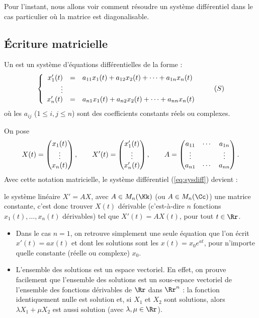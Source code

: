 \documentclass[12pt, class=report,crop=false]{standalone}
\begin{document}
Pour l'instant, nous allons voir comment résoudre un système différentiel dans le cas particulier où la matrice est diagonalisable.
 

\subsection{\'Ecriture matricielle}


Un  est un système d'équations différentielles de la forme :
\begin{equation}
\left\{\begin{array}{rcl}
x'_1(t)&=& a_{11}x_1(t)+a_{12}x_2(t)+\cdots+a_{1n}x_n(t)\cr
\vdots&& \cr 
x'_n(t) &=& a_{n1}x_1(t)+a_{n2}x_2(t)+\cdots+a_{nn}x_n(t)
\end{array}\right.
\label{eq:sysdiff}\tag{$S$}
\end{equation}
où les $a_{ij}$ ($1\le i,j \le n$) sont des coefficients constants réels ou complexes. 

On pose 
$$X(t) = \begin{pmatrix}x_1(t)\cr \vdots \cr x_n(t)\end{pmatrix},\qquad
X'(t) = \begin{pmatrix}x_1'(t)\cr \vdots \cr x_n'(t)\end{pmatrix},\qquad
A = \begin{pmatrix}
a_{11} & \cdots & a_{1n} \cr
\vdots &       & \vdots \cr
a_{n1} & \cdots & a_{nn} \cr
\end{pmatrix}.$$
Avec cette notation matricielle, le système différentiel (\ref{eq:sysdiff}) devient :


 le système linéaire $X'=AX$, avec $A \in M_n(\Kk)$ (ou $A \in M_n(\Cc)$) une matrice constante, c'est donc trouver $X(t)$ dérivable (c'est-à-dire $n$ fonctions $x_1(t),\ldots,x_n(t)$ dérivables) tel que $X'(t) = A X(t)$, pour tout $t \in \Rr$.


\begin{remarque*}
\sauteligne
\begin{itemize}
  \item Dans le cas $n=1$, on retrouve simplement une seule équation que l'on écrit $x'(t) = a x(t)$ et dont les solutions sont les $x(t) = x_0 e^{at}$, pour n'importe quelle constante (réelle ou complexe) $x_0$.
  \item L'ensemble des solutions est un espace vectoriel. En effet, on prouve facilement que l'ensemble des solutions est un sous-espace vectoriel de l'ensemble des fonctions dérivables de $\Rr$ dans $\Rr^n$ : la fonction identiquement nulle est solution et, si $X_1$ et $X_2$ sont solutions, alors $\lambda X_1+\mu X_2$ est aussi solution (avec $\lambda,\mu \in \Rr$).
\end{itemize}
\end{remarque*}
\end{document}

